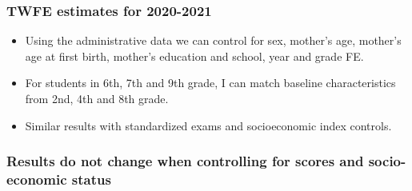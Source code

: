 \documentclass{beamer}
\begin{document}
\begin{frame}
    \label{frame:birthorder}
    \frametitle{TWFE estimates for 2020-2021}
       \begin{itemize}
           \item Using the administrative data we can control for sex, mother's age, mother's age at first birth, mother's education and school, year and grade FE.
           \item For students in 6th, 7th and 9th grade, I can match baseline characteristics from 2nd, 4th and 8th grade.
           \item Similar results with standardized exams and socioeconomic index controls.


       \end{itemize}
\end{frame}


\begin{frame}
    \label{frame:twfe_gpa_controls}
    \frametitle{Results do not change when controlling for scores and socio-economic status}
        {
    }

      \begin{flushleft}
        \hyperlink{frame:twfe_gpa_controls_siblings}{}
        \hyperlink{frame:twfe_gpa_controls_1}{}
        \hyperlink{frame:twfe_gpa_controls_2}{}
         \hyperlink{frame:twfe_gpa_controls_3}{}
        \hyperlink{frame:twfe_gpa_controls_4}{}  
    \end{flushleft}   
    
\end{frame}
\end{document}

